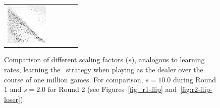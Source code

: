 \begin{figure}[h]
\begin{tabular}{c | c c c c}
			\includegraphics[width=2cm]{images/findings/experiments/learning_rate/lr_150_1mm.png} \\ %
	\end{tabular}

\caption{
	Comparison of different scaling factors ($s$),
	analogous to learning rates,
	learning the \handmaxavg\ strategy
	when playing as the dealer
	over the course of one million games.
	For comparison, $s = 10.0$ during Round 1 and $s = 2.0$ for Round 2
	(see Figures~\ref{fig_r1-flip} and~\ref{fig:r2-flip-loser}).
	}
\label{fig:expts-lr-comp}
\end{figure}
